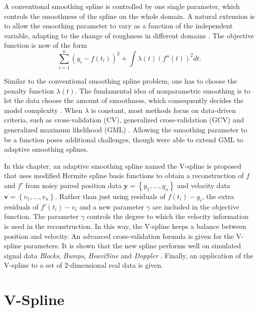 A conventional smoothing spline is controlled by one single parameter, which controls the smoothness of the spline on the whole domain. A natural extension is to allow the smoothing parameter to vary as a function of the independent variable, adapting to the change of roughness in different domains \citep{silverman1985some, donoho1995wavelet}. The objective function is now of the form 
\begin{equation}\label{objective}
\sum_{i=1}^{n}\left(y_i-f(t_i) \right)^2+\int\lambda(t) \left( f''(t)\right)^2 dt.
\end{equation}


Similar to the conventional smoothing spline problem, one has to choose the penalty function $\lambda(t)$. The fundamental idea of nonparametric smoothing is to let the data choose the amount of smoothness, which consequently decides the model complexity \citep{gu1998model}. When $\lambda$ is constant, most methods focus on data-driven criteria, such as cross-validation (CV), generalized cross-validation (GCV) \citep{craven1978smoothing} and generalized maximum likelihood (GML) \citep{wahba1985comparison}. Allowing the smoothing parameter to be a function poses additional challenges, though \cite{liu2010data} were able to extend GML to adaptive smoothing splines.


In this chapter, an adaptive smoothing spline named the V-spline is proposed that uses modified Hermite spline basis functions to obtain a reconstruction of $f$ and $f'$ from noisy paired position data $\mathbf{y}=\left\lbrace y_1,\ldots,y_n\right\rbrace$ and velocity data $\mathbf{v}=\left\lbrace v_1,\ldots,v_n\right\rbrace$. Rather than just using residuals of $f(t_i)-y_i$, the extra residuals of $f'(t_i)-v_i$ and a new parameter $\gamma$ are included in the objective function. The parameter $\gamma$ controls the degree to which the velocity information is used in the reconstruction. In this way, the V-spline keeps a balance between position and velocity. An advanced cross-validation formula is given for the V-spline parameters. It is shown that the new spline performs well on simulated signal data \textit{Blocks}, \textit{Bumps}, \textit{HeaviSine} and \textit{Doppler} \citep{donoho1994ideal}. Finally, an application of the V-spline to a set of 2-dimensional real data is given. 


\section{V-Spline}\label{SectionTractorSpline}

